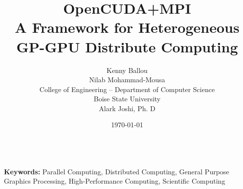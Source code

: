 \documentclass[a4paper,11pt]{article}
\title{OpenCUDA+MPI\\
       A Framework for Heterogeneous GP-GPU Distribute Computing}
\date{\today}
\author{Kenny Ballou\\
        Nilab Mohammad-Mousa\\
        College of Engineering -- Department of Computer Science\\
        Boise State University\\
        Alark Joshi, Ph. D}
\begin{document}


\nocite{*}
\thispagestyle{fancy}
\\
\textbf{Keywords:} Parallel Computing, Distributed Computing, General Purpose
Graphics Processing, High-Performance Computing, Scientific Computing




%
%
\appendix
%

\printglossaries
\end{document}
